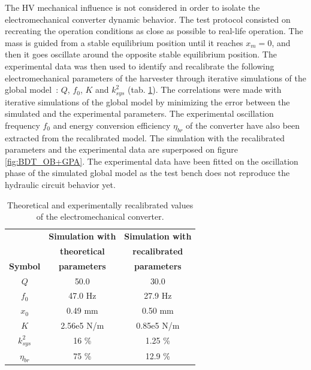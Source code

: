 \documentclass[3p,twocolumn,preprint]{elsarticle}
\begin{document}
The HV mechanical influence is not considered in order to isolate the electromechanical converter dynamic behavior. The test protocol consisted on recreating the operation conditions as close as possible to real-life operation. The mass is guided from a stable equilibrium position until it reaches \mbox{$x_m=0$}, and then it goes oscillate around the opposite stable equilibrium position. The experimental data was then used to identify and recalibrate the following electromechanical parameters of the harvester through iterative simulations of the global \mbox{model :} $Q$, $f_0$, $K$ and $k_{sys}^2$ (tab. \ref{tab:parametres_lacher_free}). The correlations were made with iterative simulations of the global model by minimizing the error between the simulated and the experimental parameters. The experimental oscillation frequency $f_0$ and energy conversion efficiency $\eta_{br}$ of the converter have also been extracted from the recalibrated model. The simulation with the recalibrated parameters and the experimental data are superposed on figure \ref{fig:BDT_OB+GPA}. The experimental data have been fitted on the oscillation phase of the simulated global model as the test bench does not reproduce the hydraulic circuit behavior yet.
\begin{table}[!htbp]
\centering
\captionsetup{justification=centering}
	\begin{tabular}{ c | c | c }
	\toprule
	& \textbf{Simulation with}  	   & \textbf{Simulation with}       \\
	& \textbf{theoretical}  		   & \textbf{recalibrated }		 	\\
	\multirow{-3}{*}{\textbf{Symbol}}
	& \textbf{parameters}			   & \textbf{parameters} 			\\
	\midrule
	$Q$                       & 50.0                  & 30.0 		  	\\  
	$f_0$                     & 47.0 Hz               & 27.9 Hz  		\\
	$x_0$                     & 0.49 mm               & 0.50 mm    		\\
	$K$                       & 2.56e5 N/m            & 0.85e5 N/m 		\\
	${k^2_{sys}}$             & 16 \%                 & 1.25 \% 		\\
	$\eta_{br}$               & 75 \%                 & 12.9 \%   		\\
	\bottomrule
	\end{tabular}
	\caption{Theoretical and experimentally recalibrated values of the electromechanical converter.}
	\label{tab:parametres_lacher_free}
\end{table} 
\end{document}
